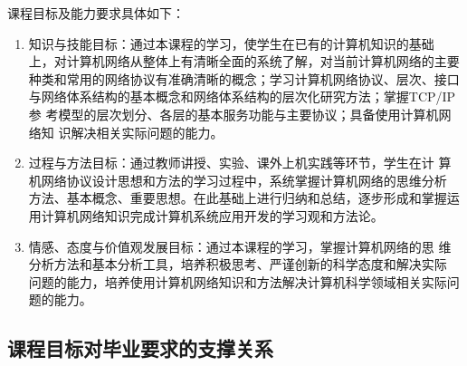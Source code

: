 \documentclass{swfusyllabus}
\begin{document}
课程目标及能力要求具体如下：
\begin{enumerate}
\item 知识与技能目标：通过本课程的学习，使学生在已有的计算机知识的基础
  上，对计算机网络从整体上有清晰全面的系统了解，对当前计算机网络的主要
  种类和常用的网络协议有准确清晰的概念；学习计算机网络协议、层次、接口
  与网络体系结构的基本概念和网络体系结构的层次化研究方法；掌握TCP/IP参
  考模型的层次划分、各层的基本服务功能与主要协议；具备使用计算机网络知
  识解决相关实际问题的能力。
\item 过程与方法目标：通过教师讲授、实验、课外上机实践等环节，学生在计
  算机网络协议设计思想和方法的学习过程中，系统掌握计算机网络的思维分析
  方法、基本概念、重要思想。在此基础上进行归纳和总结，逐步形成和掌握运
  用计算机网络知识完成计算机系统应用开发的学习观和方法论。
\item 情感、态度与价值观发展目标：通过本课程的学习，掌握计算机网络的思
  维分析方法和基本分析工具，培养积极思考、严谨创新的科学态度和解决实际
  问题的能力，培养使用计算机网络知识和方法解决计算机科学领域相关实际问
  题的能力。
\end{enumerate}

\subsection{课程目标对毕业要求的支撑关系}
\end{document}
